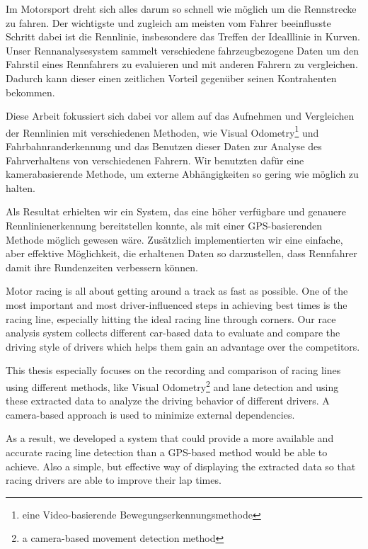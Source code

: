 \documentclass[%
a4paper,
12pt,
2.5headlines, 
bigheadings, 
titlepage, 
openbib,
]{scrartcl}
\newcommand{\mainmatter}{\pagenumbering{arabic}\setcounter{page}{1}}
\begin{document}
	\myabstract
	{%
	Im Motorsport dreht sich alles darum so schnell wie möglich um die Rennstrecke zu fahren. Der wichtigste und zugleich am meisten vom Fahrer beeinflusste Schritt dabei ist die Rennlinie, insbesondere das Treffen der Idealllinie in Kurven. Unser Rennanalysesystem sammelt verschiedene fahrzeugbezogene Daten um den Fahrstil eines Rennfahrers zu evaluieren und mit anderen Fahrern zu vergleichen. Dadurch kann dieser einen zeitlichen Vorteil gegenüber seinen Kontrahenten bekommen.

	Diese Arbeit fokussiert sich dabei vor allem auf das Aufnehmen und Vergleichen der Rennlinien mit verschiedenen Methoden, wie Visual Odometry\footnote{eine Video-basierende Bewegungserkennungsmethode} und Fahrbahnranderkennung und das Benutzen dieser Daten zur Analyse des Fahrverhaltens von verschiedenen Fahrern. Wir benutzten dafür eine kamerabasierende Methode, um externe Abhängigkeiten so gering wie möglich zu halten.

	Als Resultat erhielten wir ein System, das eine höher verfügbare und genauere Rennlinienerkennung bereitstellen konnte, als mit einer GPS-basierenden Methode möglich gewesen wäre. Zusätzlich implementierten wir eine einfache, aber effektive Möglichkeit, die erhaltenen Daten so darzustellen, dass Rennfahrer damit ihre Rundenzeiten verbessern können.
	\clearpage
	}{%
	Motor racing is all about getting around a track as fast as possible. One of the most important and most driver-influenced steps in achieving best times is the racing line, especially hitting the ideal racing line through corners. Our race analysis system collects different car-based data to evaluate and compare the driving style of drivers which helps them gain an advantage over the competitors.

	This thesis especially focuses on the recording and comparison of racing lines using different methods, like Visual Odometry\footnote{a camera-based movement detection method} and lane detection and using these extracted data to analyze the driving behavior of different drivers. A camera-based approach is used to minimize external dependencies.

	As a result, we developed a system that could provide a more available and accurate racing line detection than a GPS-based method would be able to achieve. Also a simple, but effective way of displaying the extracted data so that racing drivers are able to improve their lap times.
	}
	
	\tableofcontents
	\clearpage
	\mainmatter

	
	
	
	
	
	
	
	
	
	
	\clearpage	
	
	
	
\end{document}

